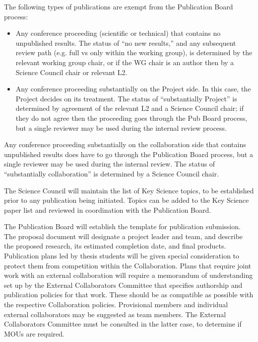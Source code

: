 \documentclass[12pt]{article}
\begin{document}
The following types of publications are exempt from the Publication Board process:

\begin{itemize}

\item Any conference proceeding (scientific or technical) that contains no unpublished results. The status of ``no new results,'' and any subsequent review path (e.g. full vs only within the working group), is determined by the relevant working group chair, or if the WG chair is an author then by a Science Council chair or relevant L2.

\item Any conference proceeding substantially on the Project side.  In this case, the Project decides on its treatment. The status of ``substantially Project'' is determined by agreement of the relevant L2 and a Science Council chair; if they do not agree then the proceeding goes through the Pub Board process, but a single reviewer may be used during the internal review process.

\end{itemize}

Any conference proceeding substantially on the collaboration side that contains unpublished results does have to go through the Publication Board process, but a single reviewer may be used during the internal review. The status of ``substantially collaboration'' is determined by a Science Council chair.

The Science Council will maintain the list of Key Science topics, to be established prior to any publication being initiated.  Topics can be added to the Key Science paper list and reviewed in coordination with the Publication Board.

The Publication Board will establish the template for publication submission.  The proposal document will designate a project leader and team, and describe the proposed research, its estimated completion date, and final products.
Publication plans led by thesis students will be given special consideration to protect them from competition within the Collaboration. Plans that require joint work with an external collaboration will require a memorandum of understanding set up by the External Collaborators Committee that specifies authorship and publication policies for that work.  These should be as compatible as possible with the respective Collaboration policies.  Provisional members and individual external collaborators may be suggested as team members.  The External Collaborators Committee must be consulted in the latter case, to determine if MOUs are required.
\end{document}
